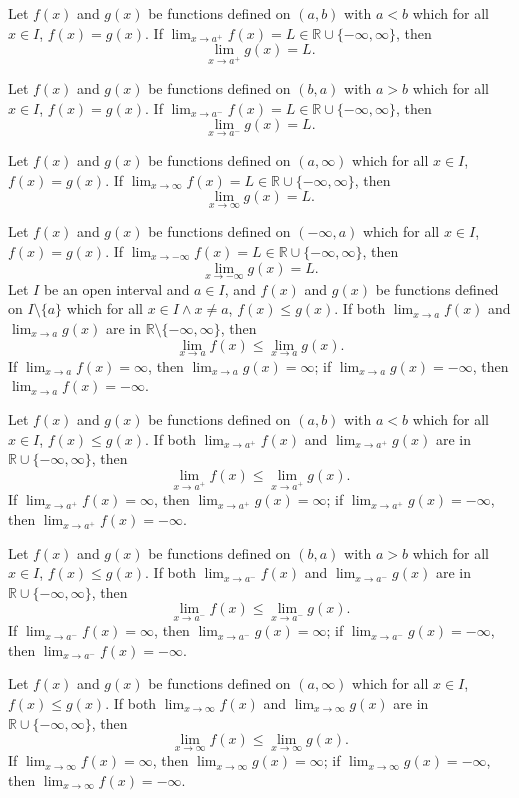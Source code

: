 \documentclass[a4paper,12pt]{report}
\begin{document}
Let $f(x)$ and $g(x)$ be functions defined on $(a,b)$ with $a<b$ which for all $x\in I$, $f(x)=g(x)$. If $\lim_{x\to a^+}f(x)=L\in\mathbb{R}\cup\{-\infty,\infty\}$, then
\[\lim_{x\to a^+}g(x)=L.\]

Let $f(x)$ and $g(x)$ be functions defined on $(b,a)$ with $a>b$ which for all $x\in I$, $f(x)=g(x)$. If $\lim_{x\to a^-}f(x)=L\in\mathbb{R}\cup\{-\infty,\infty\}$, then
\[\lim_{x\to a^-}g(x)=L.\]

Let $f(x)$ and $g(x)$ be functions defined on $(a,\infty)$ which for all $x\in I$, $f(x)=g(x)$. If $\lim_{x\to\infty}f(x)=L\in\mathbb{R}\cup\{-\infty,\infty\}$, then
\[\lim_{x\to\infty}g(x)=L.\]

Let $f(x)$ and $g(x)$ be functions defined on $(-\infty,a)$ which for all $x\in I$, $f(x)=g(x)$. If $\lim_{x\to-\infty}f(x)=L\in\mathbb{R}\cup\{-\infty,\infty\}$, then
\[\lim_{x\to-\infty}g(x)=L.\]
Let $I$ be an open interval and $a\in I$, and $f(x)$ and $g(x)$ be functions defined on $I\setminus\{a\}$ which for all $x\in I\land x\neq a$, $f(x)\leq g(x)$. If both $\lim_{x\to a}f(x)$ and $\lim_{x\to a}g(x)$ are in $\mathbb{R}\setminus\{-\infty,\infty\}$, then
\[\lim_{x\to a}f(x)\leq\lim_{x\to a}g(x).\]
If $\lim_{x\to a}f(x)=\infty$, then $\lim_{x\to a}g(x)=\infty$; if $\lim_{x\to a}g(x)=-\infty$, then $\lim_{x\to a}f(x)=-\infty$.

Let $f(x)$ and $g(x)$ be functions defined on $(a,b)$ with $a<b$ which for all $x\in I$, $f(x)\leq g(x)$. If both $\lim_{x\to a^+}f(x)$ and $\lim_{x\to a^+}g(x)$ are in $\mathbb{R}\cup\{-\infty,\infty\}$, then
\[\lim_{x\to a^+}f(x)\leq\lim_{x\to a^+}g(x).\]
If $\lim_{x\to a^+}f(x)=\infty$, then $\lim_{x\to a^+}g(x)=\infty$; if $\lim_{x\to a^+}g(x)=-\infty$, then $\lim_{x\to a^+}f(x)=-\infty$.

Let $f(x)$ and $g(x)$ be functions defined on $(b,a)$ with $a>b$ which for all $x\in I$, $f(x)\leq g(x)$. If both $\lim_{x\to a^-}f(x)$ and $\lim_{x\to a^-}g(x)$ are in $\mathbb{R}\cup\{-\infty,\infty\}$, then
\[\lim_{x\to a^-}f(x)\leq\lim_{x\to a^-}g(x).\]
If $\lim_{x\to a^-}f(x)=\infty$, then $\lim_{x\to a^-}g(x)=\infty$; if $\lim_{x\to a^-}g(x)=-\infty$, then $\lim_{x\to a^-}f(x)=-\infty$.

Let $f(x)$ and $g(x)$ be functions defined on $(a,\infty)$ which for all $x\in I$, $f(x)\leq g(x)$. If both $\lim_{x\to\infty}f(x)$ and $\lim_{x\to\infty}g(x)$ are in $\mathbb{R}\cup\{-\infty,\infty\}$, then
\[\lim_{x\to\infty}f(x)\leq\lim_{x\to\infty}g(x).\]
If $\lim_{x\to\infty}f(x)=\infty$, then $\lim_{x\to\infty}g(x)=\infty$; if $\lim_{x\to\infty}g(x)=-\infty$, then $\lim_{x\to\infty}f(x)=-\infty$.
\end{document}
